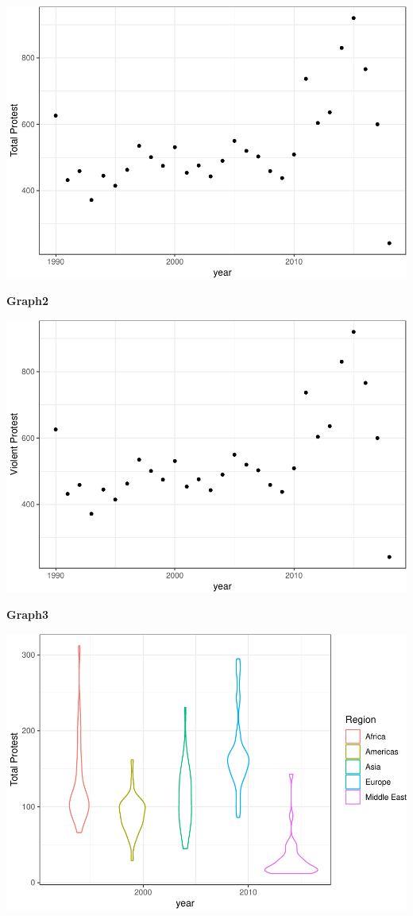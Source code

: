 \documentclass[11pt,]{article}
\begin{document}
\includegraphics{replication_files/figure-latex/unnamed-chunk-2-1.pdf}

\begin{center}
    \textbf{Graph2}
\end{center}

\includegraphics{replication_files/figure-latex/unnamed-chunk-3-1.pdf}

\begin{center}
    \textbf{Graph3}
\end{center}

\includegraphics{replication_files/figure-latex/unnamed-chunk-4-1.pdf}
\end{document}
